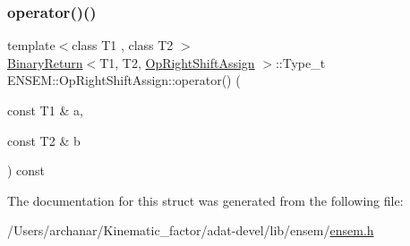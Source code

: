 \subsubsection{\texorpdfstring{operator()()}{operator()()}\hspace{0.1cm}{\footnotesize\ttfamily [3/3]}}
{\footnotesize\ttfamily template$<$class T1 , class T2 $>$ \\
\mbox{\hyperlink{structENSEM_1_1BinaryReturn}{Binary\+Return}}$<$T1, T2, \mbox{\hyperlink{structENSEM_1_1OpRightShiftAssign}{Op\+Right\+Shift\+Assign}} $>$\+::Type\+\_\+t E\+N\+S\+E\+M\+::\+Op\+Right\+Shift\+Assign\+::operator() (\begin{DoxyParamCaption}\item[{const T1 \&}]{a,  }\item[{const T2 \&}]{b }\end{DoxyParamCaption}) const\hspace{0.3cm}{\ttfamily [inline]}}



The documentation for this struct was generated from the following file\+:\begin{DoxyCompactItemize}
\item 
/\+Users/archanar/\+Kinematic\+\_\+factor/adat-\/devel/lib/ensem/\mbox{\hyperlink{adat-devel_2lib_2ensem_2ensem_8h}{ensem.\+h}}\end{DoxyCompactItemize}
